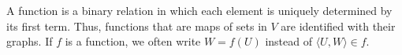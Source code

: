 A function is a binary relation in which each element is uniquely determined by its first term. Thus, functions that are maps of sets in $V$ are identified with their graphs. If $f$ is a function, we often write $W = f(U)$ instead of $\langle U, W \rangle \in f$.
